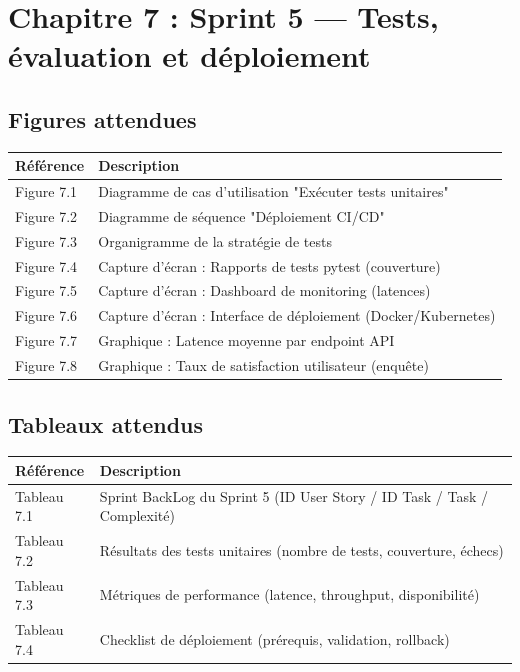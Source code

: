 \documentclass[12pt,a4paper]{article}
\begin{document}
\section{Chapitre 7 : Sprint 5 — Tests, évaluation et déploiement}

\subsection*{Figures attendues}

\begin{longtable}{p{2cm} p{12cm}}
    \textbf{Référence} & \textbf{Description} \\
    \midrule
    \endhead
    
    Figure 7.1 & Diagramme de cas d'utilisation "Exécuter tests unitaires" \\
    Figure 7.2 & Diagramme de séquence "Déploiement CI/CD" \\
    Figure 7.3 & Organigramme de la stratégie de tests \\
    Figure 7.4 & Capture d'écran : Rapports de tests pytest (couverture) \\
    Figure 7.5 & Capture d'écran : Dashboard de monitoring (latences) \\
    Figure 7.6 & Capture d'écran : Interface de déploiement (Docker/Kubernetes) \\
    Figure 7.7 & Graphique : Latence moyenne par endpoint API \\
    Figure 7.8 & Graphique : Taux de satisfaction utilisateur (enquête) \\
    \bottomrule
\end{longtable}

\subsection*{Tableaux attendus}

\begin{longtable}{p{2cm} p{12cm}}
    \textbf{Référence} & \textbf{Description} \\
    \midrule
    \endhead
    
    Tableau 7.1 & Sprint BackLog du Sprint 5 (ID User Story / ID Task / Task / Complexité) \\
    Tableau 7.2 & Résultats des tests unitaires (nombre de tests, couverture, échecs) \\
    Tableau 7.3 & Métriques de performance (latence, throughput, disponibilité) \\
    Tableau 7.4 & Checklist de déploiement (prérequis, validation, rollback) \\
    \bottomrule
\end{longtable}
\end{document}
